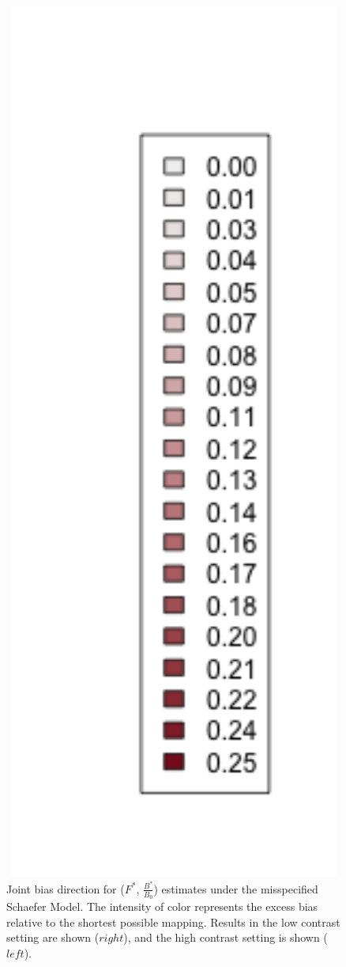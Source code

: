 \begin{figure}[h!]
\begin{minipage}[h!]{0.44\textwidth}
\end{minipage}
\begin{minipage}[h!]{0.09\textwidth}
\hspace{-1cm}
\includegraphics[width=1.5\textwidth]{../ptNew/subLegnd.png}
\end{minipage}
\caption{
Joint bias direction for ($F^*$, $\frac{B^*}{B_0}$) estimates under
the misspecified Schaefer Model. The intensity of color represents the excess
bias relative to the shortest possible mapping. Results in the low contrast setting
are shown ($right$), and the high contrast setting is shown ($left$).
}
\label{arrowsPT}
\end{figure}

